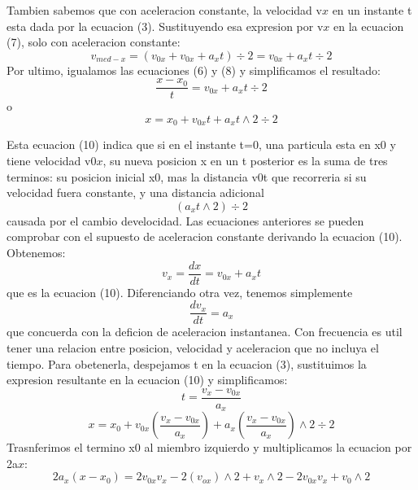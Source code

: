 \documentclass{article}
\begin{document}
Tambien sabemos que con aceleracion constante, la velocidad v$x$ en un instante t esta dada por la ecuacion (3). Sustituyendo esa expresion por v$x$ en la ecuacion
(7), solo con aceleracion constante:
\begin{equation}
 v_{med-x} =(v_{0x}+ v_{0x} + a_{x}t)\div2 = v_{0x} + a_{x}t\div{2}
\end{equation}
Por ultimo, igualamos las ecuaciones (6) y (8) y simplificamos el resultado:
\begin{equation}
 \frac {x-x_{0}}{t} = v_{0x} + a_{x}t\div{2}
\end{equation}
o
\begin{equation}
 x = x_{0} + v_{0x}t + a_{x}t\wedge{2}\div{2}
\end{equation}

Esta ecuacion (10) indica que si en el instante t=0, una particula esta en x$0$ y tiene velocidad v$0x$, su nueva posicion x en un t posterior es la suma de tres terminos: su posicion inicial
x$0$, mas la distancia v$0$t que recorreria si su velocidad fuera constante, y una distancia adicional 
\begin{equation}
 (a_{x}t\wedge{2})\div{2} 
\end{equation}
causada por el cambio develocidad.
Las ecuaciones anteriores se pueden comprobar con el supuesto de aceleracion constante derivando la ecuacion (10). Obtenemos:
\begin{equation}
 v_{x}= \frac{dx}{dt}= v_{0x}+ a_{x}t
\end{equation}
que es la ecuacion (10). Diferenciando otra vez, tenemos simplemente
\begin{equation}
\frac{dv_{x}}{dt}= a_{x}
\end{equation}
que concuerda con la deficion de aceleracion instantanea.
Con frecuencia es util tener una relacion entre posicion, velocidad y aceleracion que no incluya el tiempo. Para obetenerla, despejamos t en la ecuacion 
(3), sustituimos la expresion resultante en la ecuacion (10) y simplificamos:
\begin{equation}
t= \frac{v_{x}-v_{0x}}{a_{x}}
\end{equation}
\begin{equation}
 x = x_{0} + v_{0x}(\frac{v_{x}-v_{0x}}{a_{x}}) + a_{x}(\frac{v_{x}-v_{0x}}{a_{x}})\wedge2\div{2}
\end{equation}
Trasnferimos el termino x$0$ al miembro izquierdo y multiplicamos la ecuacion por 2a$x$:
\begin{equation}
2a_{x}(x-x_{0})= 2v_{0x}v_{x} -2(v_{ox})\wedge{2} + v_{x}\wedge{2} -2v_{0x}v_{x} + v_{0}\wedge{2}
\end{equation}
\end{document}
